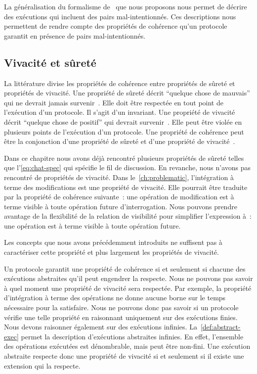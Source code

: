 La généralisation du formalisme de~\textcite{burckhardt_eventualconsistency_2014} que nous proposons nous permet de décrire des exécutions qui incluent des pairs mal-intentionnés.
Ces descriptions nous permettent de rendre compte des propriétés de cohérence qu'un protocole garantit en présence de pairs mal-intentionnés.



\subsection{Vivacité et sûreté}\label{subsec:consistency-spec-liveness-safety}

La littérature divise les propriétés de cohérence entre propriétés de sûreté et propriétés de vivacité.
Une propriété de sûreté décrit \enquote{quelque chose de mauvais} qui ne devrait jamais survenir~\autocite{lamport_1977_correctness}.
Elle doit être respectée en tout point de l'exécution d'un protocole.
Il s'agit d'un invariant.
Une propriété de vivacité décrit \enquote{quelque chose de positif} qui devrait survenir~\autocite{lamport_1977_correctness}.
Elle peut être violée en plusieurs points de l'exécution d'un protocole.
Une propriété de cohérence peut être la conjonction d'une propriété de sûreté et d'une propriété de vivacité~\autocite{alpern_liveness_1985}.

Dans ce chapitre nous avons déjà rencontré plusieurs propriétés de sûreté telles que l'\autoref{eq:chat-spec} qui spécifie le fil de discussion.
En revanche, nous n'avons pas rencontré de propriétés de vivacité.
Dans le~\autoref{ch:problematic}, l'intégration à terme des modifications est une propriété de vivacité.
Elle pourrait être traduite par la propriété de cohérence suivante~: une opération de modification est à terme visible à toute opération future d'interrogation.
Nous pouvons prendre avantage de la flexibilité de la relation de visibilité pour simplifier l'expression à~: une opération est à terme visible à toute opération future.



Les concepts que nous avons précédemment introduits ne suffisent pas à caractériser cette propriété et plus largement les propriétés de vivacité.

Un protocole garantit une propriété de cohérence si et seulement si chacune des exécutions abstraites qu'il peut engendrer la respecte.
Nous ne pouvons pas savoir à quel moment une propriété de vivacité sera respectée.
Par exemple, la propriété d'intégration à terme des opérations ne donne aucune borne sur le temps nécessaire pour la satisfaire.
Nous ne pouvons donc pas savoir si un protocole vérifie une telle propriété en raisonnant uniquement sur des exécutions finies.
Nous devons raisonner également sur des exécutions infinies.
La~\autoref{def:abstract-exec} permet la description d'exécutions abstraites infinies.
En effet, l'ensemble des opérations exécutées est dénombrable, mais peut être non-fini.
Une exécution abstraite respecte donc une propriété de vivacité si et seulement si il existe une extension qui la respecte.


